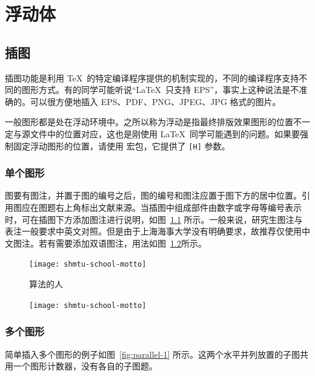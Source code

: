 \chapter{浮动体}

\section{插图}

插图功能是利用 \TeX\ 的特定编译程序提供的机制实现的，不同的编译程序支持不同的图形方式。有的同学可能听说“\LaTeX\ 只支持 EPS”，事实上这种说法是不准确的。\XeTeX 可以很方便地插入 EPS、PDF、PNG、JPEG、JPG 格式的图片。

一般图形都是处在浮动环境中。之所以称为浮动是指最终排版效果图形的位置不一定与源文件中的位置对应，这也是刚使用 \LaTeX\ 同学可能遇到的问题。如果要强制固定浮动图形的位置，请使用  宏包，它提供了 \texttt{[H]} 参数。

\subsection{单个图形}

图要有图注，并置于图的编号之后，图的编号和图注应置于图下方的居中位置。引用图应在图题右上角标出文献来源。当插图中组成部件由数字或字母等编号表示时，可在插图下方添加图注进行说明，如图~\ref{fig:shmtu-school-motto} 所示。一般来说，研究生图注与表注一般要求中英文对照。但是由于上海海事大学没有明确要求，故推荐仅使用中文图注。若有需要添加双语图注，用法如图~\ref{fig:shmtu-school-motto-2}所示。

\begin{figure}[!htp]
	\centering
	\texttt{[image: shmtu-school-motto]}
  \caption{算法的人}
	\label{fig:shmtu-school-motto}
\end{figure}

\begin{figure}[!htp]
	\centering
	\texttt{[image: shmtu-school-motto]}
	\label{fig:shmtu-school-motto-2}
\end{figure}

\subsection{多个图形}

简单插入多个图形的例子如图~\ref{fig:parallel-1} 所示。这两个水平并列放置的子图共用一个图形计数器，没有各自的子图题。

